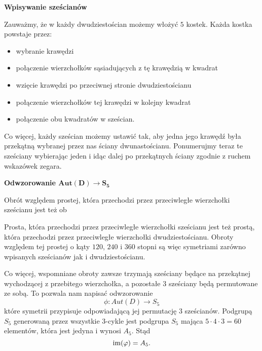 \begin{wrapfigure}{l}{6cm}
\end{wrapfigure}

\textbf{Wpisywanie sześcianów}

Zauważmy, że w każdy dwudziestościan możemy włożyć $5$ kostek. Każda kostka powstaje przez:
\begin{itemize}
  \item wybranie krawędzi
  \item połączenie wierzchołków sąsiadujących z tę krawędzią w kwadrat
  \item wzięcie krawędzi po przeciwnej stronie dwudziestościanu
  \item połączenie wierzchołków tej krawędzi w kolejny kwadrat
  \item połączenie obu kwadratów w sześcian.
\end{itemize}
Co więcej, każdy sześcian możemy ustawić tak, aby jedna jego krawędź była przekątną wybranej przez nas ściany dwunastościanu. Ponumerujmy teraz te sześciany wybierając jeden i idąc dalej po przekątnych ściany zgodnie z ruchem wskazówek zegara.

\textbf{Odwzorowanie $\boldsymbol{Aut(D)\to S_5}$}

Obrót względem prostej, która przechodzi przez przeciwległe wierzchołki sześcianu jest też ob

Prosta, która przechodzi przez przeciwległe wierzchołki sześcianu jest też prostą, która przechodzi przez przeciwległe wierzchołki dwudziestościanu. Obroty względem tej prostej o kąty $120$, $240$ i $360$ stopni są więc symetriami zarówno wpisanych sześcianów jak i dwudziestościanu.

Co więcej, wspomniane obroty zawsze trzymają sześciany będące na przekątnej wychodzącej z przebitego wierzchołka, a pozostałe $3$ sześciany będą permutowane ze sobą. To pozwala nam napisać odwzorowanie 
$$\phi:Aut(D)\to S_5$$
które symetrii przypisuje odpowiadającą jej permutację $3$ sześcianów. Podgrupą $S_5$ generowaną przez wszystkie $3$-cykle jest podgrupa $S_5$ mająca $5\cdot 4\cdot 3=60$ elementów, która jest jedyna i wynosi $A_5$. Stąd 
$$\operatorname{im}(\varphi)=A_5.$$

